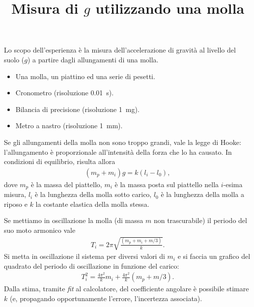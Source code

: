 \documentclass{lab1-article}
\title{Misura di $g$ utilizzando una molla}
\begin{document}
\begin{article}

\maketitle

\secsummary
Lo scopo dell'esperienza \`e la misura dell'accelerazione di gravit\`a al
livello del suolo ($g$) a partire dagli allungamenti di una molla.


\secmaterials

\begin{itemize}
\item Una molla, un piattino ed una serie di pesetti.
\item Cronometro (risoluzione 0.01~s).
\item Bilancia di precisione (risoluzione 1~mg).
\item Metro a nastro (risoluzione 1~mm).
\end{itemize}


\secmeasurements

Se gli allungamenti della molla non sono troppo grandi, vale la legge di Hooke:
l'allungamento \`e proporzionale all'intensit\`a della forza che lo ha
causato. In condizioni di equilibrio, risulta allora
\begin{align}\label{eq:equilibrio}
(m_p + m_i)g = k(l_i - l_0),
\end{align}
dove $m_p$ \`e la massa del piattello, $m_i$ \`e la massa posta sul piattello
nella $i$-esima misura, $l_i$ \`e la lunghezza della molla sotto carico, $l_0$
\`e la lunghezza della molla a riposo e $k$ la costante elastica della molla
stessa.



Se mettiamo in oscillazione la molla (di massa $m$ non trascurabile) il periodo
del suo moto armonico vale
\begin{align}
T_i = 2\pi\sqrt{\frac{(m_p + m_i + m/3)}{k}}.
\end{align}
Si metta in oscillazione il sistema per diversi valori di $m_i$ e si faccia
un grafico del quadrato del periodo di oscillazione in funzione del carico:
\begin{align}
T^2_i = \frac{4\pi^2}{k}m_i + \frac{4\pi^2}{k}(m_p + m/3).
\end{align}
Dalla stima, tramite \emph{fit} al calcolatore, del coefficiente angolare \`e
possibile stimare $k$ (e, propagando opportunamente l'errore, l'incertezza
associata).



\end{article}
\end{document}
